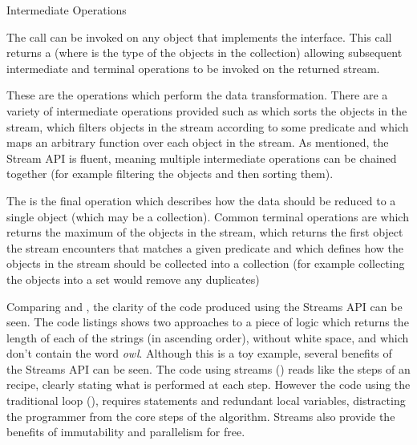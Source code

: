 \begin{labeling}{Intermediate Operations  }
	\item [Initial stream call] The  call can be invoked on any object that implements the  interface. This call returns a  (where  is the type of the objects in the collection) allowing subsequent intermediate and terminal operations to be invoked on the returned stream.
	\item [Intermediate Operations  ] These are the operations which perform the data transformation. There are a variety of intermediate operations provided such as  which sorts the objects in the stream,  which filters objects in the stream according to some predicate and  which maps an arbitrary function over each object in the stream. As mentioned, the Stream API is fluent, meaning multiple intermediate operations can be chained together (for example filtering the objects and then sorting them).
	\item [Terminal Operations] The is the final operation which describes how the data should be reduced to a single object (which may be a collection). Common terminal operations are  which returns the maximum of the objects in the stream,  which returns the first object the stream encounters that matches a given predicate and  which defines how the objects in the stream should be collected into a collection (for example collecting the objects into a set would remove any duplicates)
\end{labeling}

Comparing  and , the clarity of the code produced using the Streams API can be seen. The code listings shows two approaches to a piece of logic which returns the length of each of the strings (in ascending order), without white space, and which don't contain the word \textit{owl}. Although this is a toy example, several benefits of the Streams API can be seen. The code using streams () reads like the steps of an recipe, clearly stating what is performed at each step. However the code using the traditional  loop (), requires  statements and redundant local variables, distracting the programmer from the core steps of the algorithm. Streams also provide the benefits of immutability and parallelism for free.




